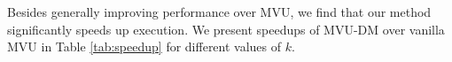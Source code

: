 \documentclass{article} %
\begin{document}
Besides generally improving performance over MVU, we find that our method significantly speeds up execution. We present speedups of MVU-DM over vanilla MVU in Table \ref{tab:speedup} for different values of $k$.




\end{document}
